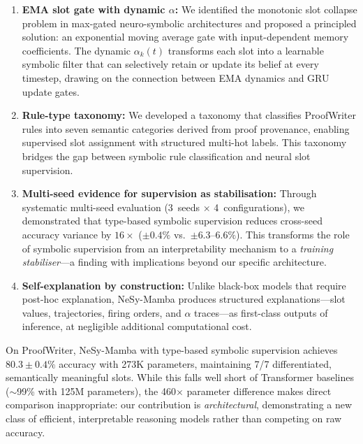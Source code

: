 \documentclass[conference]{IEEEtran}
\DeclareRobustCommand{\model}{NeSy-Mamba}
\begin{document}
\begin{enumerate}[nosep]
    \item \textbf{EMA slot gate with dynamic $\alpha$:} We
          identified the monotonic slot collapse problem in
          max-gated neuro-symbolic architectures and proposed a
          principled solution: an exponential moving average gate
          with input-dependent memory coefficients.  The dynamic
          $\alpha_k(t)$ transforms each slot into a learnable
          symbolic filter that can selectively retain or update
          its belief at every timestep, drawing on the connection
          between EMA dynamics and GRU update gates.

    \item \textbf{Rule-type taxonomy:} We developed a taxonomy
          that classifies ProofWriter rules into seven semantic
          categories derived from proof provenance, enabling
          supervised slot assignment with structured multi-hot
          labels.  This taxonomy bridges the gap between
          symbolic rule classification and neural slot
          supervision.

    \item \textbf{Multi-seed evidence for supervision as
          stabilisation:} Through systematic multi-seed evaluation
          (3~seeds $\times$ 4~configurations), we demonstrated
          that type-based symbolic supervision reduces cross-seed
          accuracy variance by $16\times$ ($\pm 0.4\%$ vs.\
          $\pm 6.3$--$6.6\%$).  This transforms the role of
          symbolic supervision from an interpretability mechanism
          to a \emph{training stabiliser}---a finding with
          implications beyond our specific architecture.

    \item \textbf{Self-explanation by construction:} Unlike
          black-box models that require post-hoc explanation,
          \model{} produces structured explanations---slot values,
          trajectories, firing orders, and $\alpha$ traces---as
          first-class outputs of inference, at negligible
          additional computational cost.
\end{enumerate}

On ProofWriter, \model{} with type-based symbolic supervision
achieves $80.3 \pm 0.4\%$ accuracy with 273K parameters,
maintaining 7/7 differentiated, semantically meaningful slots.
While this falls well short of Transformer baselines
($\sim$99\% with 125M parameters), the 460$\times$ parameter
difference makes direct comparison inappropriate: our
contribution is \emph{architectural}, demonstrating a new class
of efficient, interpretable reasoning models rather than
competing on raw accuracy.
\end{document}
